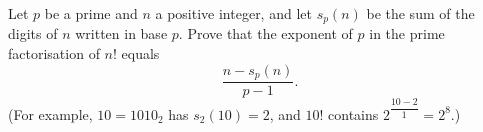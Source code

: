 Let $p$ be a prime and $n$ a positive integer, and let $s_p(n)$ be the sum of the digits of $n$ written in base $p$. Prove that the exponent of $p$ in the prime factorisation of $n!$ equals
\[
\dfrac{n-s_p(n)}{p-1}.
\]
(For example, $10=1010_2$ has $s_2(10)=2$, and $10!$ contains $2^{\dfrac{10-2}{1}}=2^8$.)
